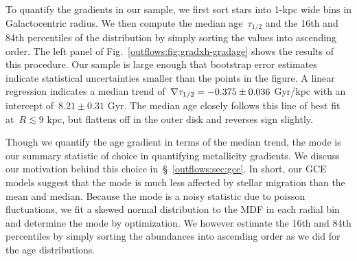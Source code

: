 To quantify the gradients in our sample, we first sort stars into 1-kpc wide
bins in Galactocentric radius.
We then compute the median age~$\tau_{1/2}$ and the 16th and 84th percentiles
of the distribution by simply sorting the values into ascending order.
The left panel of Fig.~\ref{outflows:fig:gradxh-gradage} shows the results of
this procedure.
Our sample is large enough that bootstrap error estimates indicate statistical
uncertainties smaller than the points in the figure.
A linear regression indicates a median trend of~$\nabla\tau_{1/2} = -0.375 \pm 0.036$
Gyr/kpc with an intercept of~$8.21 \pm 0.31$ Gyr.
The median age closely follows this line of best fit at~$R \lesssim 9$ kpc, but
flattens off in the outer disk and reverses sign slightly.
\par
Though we quantify the age gradient in terms of the median trend, the mode is
our summary statistic of choice in quantifying metallicity gradients.
We discuss our motivation behind this choice in~\S~\ref{outflows:sec:gce}.
In short, our GCE models suggest that the mode is much less affected by stellar
migration than the mean and median.
Because the mode is a noisy statistic due to poisson fluctuations, we fit a
skewed normal distribution to the MDF in each radial bin and determine the mode
by optimization.
We however estimate the 16th and 84th percentiles by simply sorting the
abundances into ascending order as we did for the age distributions.

